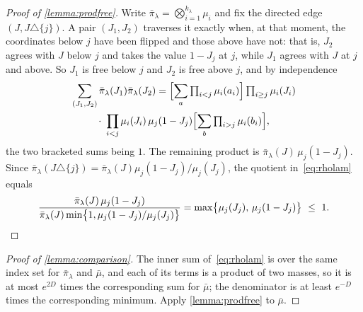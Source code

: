 \begin{proof}[Proof of \cref{lemma:prodfree}]
    Write $\bar\pi_\lambda=\bigotimes_{i=1}^{k_\lambda}\mu_i$ and fix the
    directed edge $(J,J\triangle\{j\})$. A pair $(J_1,J_2)$ traverses it
    exactly when, at that moment, the coordinates below $j$ have been
    flipped and those above have not: that is, $J_2$ agrees with $J$
    below $j$ and takes the value $1-J_j$ at $j$, while $J_1$ agrees with
    $J$ at $j$ and above. So $J_1$ is free below $j$ and $J_2$ is free
    above $j$, and by independence
    \begin{multline*}
        \sum_{(J_1,J_2)}\bar\pi_\lambda(J_1)\bar\pi_\lambda(J_2)
        =\Bigl[\sum_{a}\textstyle\prod_{i<j}\mu_i(a_i)\Bigr]
        \prod_{i\geq j}\mu_i(J_i)\\
        \cdot\ \prod_{i<j}\mu_i(J_i)\,\mu_j(1-J_j)
        \Bigl[\sum_{b}\textstyle\prod_{i>j}\mu_i(b_i)\Bigr] ,
    \end{multline*}
    the two bracketed sums being $1$. The remaining product is
    $\bar\pi_\lambda(J)\,\mu_j(1-J_j)$. Since
    $\bar\pi_\lambda(J\triangle\{j\})=\bar\pi_\lambda(J)\mu_j(1-J_j)
    /\mu_j(J_j)$, the quotient in~\eqref{eq:rholam} equals
    \begin{equation*}
        \frac{\bar\pi_\lambda(J)\,\mu_j(1-J_j)}
        {\bar\pi_\lambda(J)\min\bigl\{1,\mu_j(1-J_j)/\mu_j(J_j)\bigr\}}
        =\max\bigl\{\mu_j(J_j),\,\mu_j(1-J_j)\bigr\}\ \leq\ 1 . \qedhere
    \end{equation*}
\end{proof}

\begin{proof}[Proof of \cref{lemma:comparison}]
    The inner sum of~\eqref{eq:rholam} is over the same index set for
    $\bar\pi_\lambda$ and $\bar\mu$, and each of its terms is a product of
    two masses, so it is at most $e^{2D}$ times the corresponding sum for
    $\bar\mu$; the denominator is at least $e^{-D}$ times the
    corresponding minimum. Apply \cref{lemma:prodfree} to $\bar\mu$.
\end{proof}

